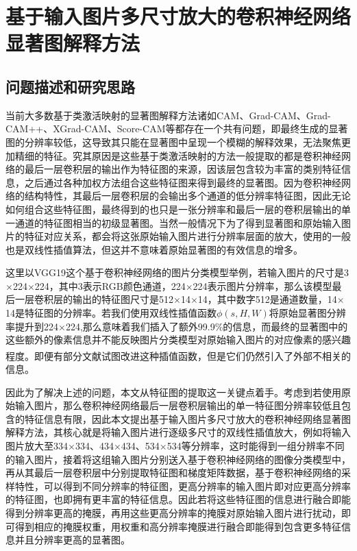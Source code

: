 

\chapter{基于输入图片多尺寸放大的卷积神经网络显著图解释方法}
\thispagestyle{others}
\pagestyle{others}
\xiaosi




\section{问题描述和研究思路}
当前大多数基于类激活映射的显著图解释方法诸如CAM、Grad-CAM、Grad-CAM++、XGrad-CAM、Score-CAM等都存在一个共有问题，即最终生成的显著图的分辨率较低，这导致其只能在显著图中呈现一个模糊的解释效果，无法聚焦更加精细的特征。究其原因是这些基于类激活映射的方法一般提取的都是卷积神经网络的最后一层卷积层的输出作为特征图的来源，因该层包含较为丰富的类别特征信息，之后通过各种加权方法组合这些特征图来得到最终的显著图。因为卷积神经网络的结构特性，其最后一层卷积层的会输出多个通道的低分辨率特征图，因此无论如何组合这些特征图，最终得到的也只是一张分辨率和最后一层的卷积层输出的单一通道的特征图相当的初级显著图。当然一般情况下为了得到显著图和原始输入图片的特征对应关系，都会将这张原始输入图片进行分辨率层面的放大，使用的一般也是双线性插值算法，但这并不意味着原始显著图的有效信息的增多。

这里以VGG19这个基于卷积神经网络的图片分类模型举例，若输入图片的尺寸是3$\times$224$\times$224，其中3表示RGB颜色通道，224$\times$224表示图片分辨率，那么该模型最后一层卷积层的输出的特征图尺寸是512$\times$14$\times$14，其中数字512是通道数量，14$\times$14是特征图的分辨率。若我们使用双线性插值函数$\phi(s,H,W)$将原始显著图分辨率提升到224$\times$224,那么意味着我们插入了额外99.9\%的信息，而最终的显著图中的这些额外的像素信息并不能反映图片分类模型对原始输入图片的对应像素的感兴趣程度。即便有部分文献\textsuperscript{\cite{adebayo2018sanity,selvaraju2017grad}}试图改进这种插值函数，但是它们仍然引入了外部不相关的信息。

因此为了解决上述的问题，本文从特征图的提取这一关键点着手。考虑到若使用原始输入图片，那么卷积神经网络最后一层卷积层输出的单一特征图分辨率较低且包含的特征信息有限，因此本文提出基于输入图片多尺寸放大的卷积神经网络显著图解释方法，其核心就是将输入图片进行逐级多尺寸的双线性插值放大，例如将输入图片放大至334$\times$334、434$\times$434、534$\times$534等分辨率，这时能得到一组分辨率不同的输入图片，接着将这组输入图片分别送入基于卷积神经网络的图像分类模型中，再从其最后一层卷积层中分别提取特征图和梯度矩阵数据，基于卷积神经网络的采样特性，可以得到不同分辨率的特征图，更高分辨率的输入图片即对应更高分辨率的特征图，也即拥有更丰富的特征信息。因此若将这些特征图的信息进行融合即能得到分辨率更高的掩膜，再用这些更高分辨率的掩膜对原始输入图片进行扰动，即可得到相应的掩膜权重，用权重和高分辨率掩膜进行融合即能得到包含更多特征信息并且分辨率更高的显著图。
